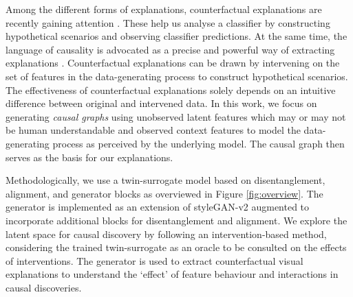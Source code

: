 \documentclass{article}
\newcommand{\akcom}[2][]{\todo[author=AK, #1]{#2}}
\newcommand{\ft}[1]{{\textcolor{red}{#1}}}
\newcommand{\ftcom}[2][]{\todo[author=FT, #1]{#2}}
\newcommand{\ftdel}[1]{\textcolor{olive}{$\times$ #1}}
\begin{document}
Among the different forms of explanations, counterfactual explanations are recently gaining attention \cite{sauer2021counterfactual, chang2018explaining, nemirovsky2020countergan, lang2021explaining}.
These help us analyse a classifier by constructing hypothetical scenarios and observing classifier predictions.
At the same time, the language of causality is advocated as a precise and powerful way of extracting explanations \cite{o2020generative}.
Counterfactual explanations can be drawn by intervening on the set of features in the data-generating process to construct hypothetical scenarios.
The effectiveness of counterfactual explanations solely depends on an intuitive difference between original and intervened data. 
%
In this work, we focus on generating \emph{causal graphs} using unobserved latent features which may or may not be human understandable and 
observed {context features} to model the data-generating process as perceived by the underlying model. The causal graph then serves as the basis for our explanations.

Methodologically, we use a twin-surrogate model based on disentanglement, alignment, and generator blocks as %
overviewed in Figure \ref{fig:overview}.
The generator is implemented as an extension of styleGAN-v2 \cite{karras2020analyzing} augmented to incorporate additional blocks for disentanglement and alignment.
We explore the latent space for causal discovery by following an intervention-based method, considering the trained twin-surrogate as an oracle to be consulted on the effects of interventions. 
The generator is used to extract counterfactual visual explanations to understand the `effect' of feature behaviour and interactions in causal discoveries.
\end{document}
